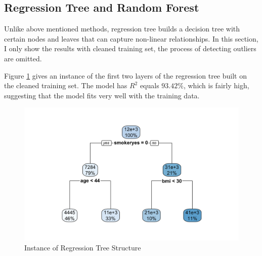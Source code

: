 \documentclass{article}
\begin{document}
\subsection{Regression Tree and Random Forest}
Unlike above mentioned methods, regression tree builds a decision tree with certain nodes and leaves that can capture non-linear relationships. In this section, I only show the results with cleaned training set, the process of detecting outliers are omitted.

Figure \ref{fig:tree_structure} gives an instance of the first two layers of the regression tree built on the cleaned training set. The model has $R^2$ equals $93.42\%$, which is fairly high, suggesting that the model fits very well with the training data. 
\begin{figure}[!ht]
	\centering
	\includegraphics[width=0.8\linewidth]{images/tree_structure.png}
	\caption{Instance of Regression Tree Structure}
	\label{fig:tree_structure}
\end{figure}
\end{document}
